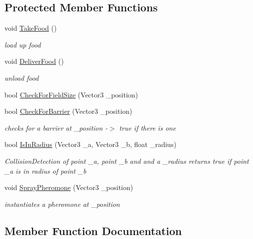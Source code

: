 \subsection*{Protected Member Functions}
\begin{DoxyCompactItemize}
\item 
void \mbox{\hyperlink{class_ant_a038dcc19d796bb4203b1d606d133f906}{Take\+Food}} ()
\begin{DoxyCompactList}\small\item\em load up food \end{DoxyCompactList}\item 
void \mbox{\hyperlink{class_ant_a4c67d1cee8cafa2f97495eda2a27a420}{Deliver\+Food}} ()
\begin{DoxyCompactList}\small\item\em unload food \end{DoxyCompactList}\item 
bool \mbox{\hyperlink{class_ant_a9c342e2d6f14a75860f518ee1086a255}{Check\+For\+Field\+Size}} (Vector3 \+\_\+position)
\item 
bool \mbox{\hyperlink{class_ant_a569320904895aca38fcbc515f3a0c611}{Check\+For\+Barrier}} (Vector3 \+\_\+position)
\begin{DoxyCompactList}\small\item\em checks for a barrier at \+\_\+position -\/$>$ true if there is one \end{DoxyCompactList}\item 
bool \mbox{\hyperlink{class_ant_a3b628e3a1ec52edeaf8b1bcd768b5a22}{Is\+In\+Radius}} (Vector3 \+\_\+a, Vector3 \+\_\+b, float \+\_\+radius)
\begin{DoxyCompactList}\small\item\em Collision\+Detection of point \+\_\+a, point \+\_\+b and and a \+\_\+radius returns true if point \+\_\+a is in radius of point \+\_\+b \end{DoxyCompactList}\item 
void \mbox{\hyperlink{class_ant_a54ff2d8ba8f1f940b3c0357a5ae101fb}{Spray\+Pheromone}} (Vector3 \+\_\+position)
\begin{DoxyCompactList}\small\item\em instantiates a pheromone at \+\_\+position \end{DoxyCompactList}\end{DoxyCompactItemize}


\subsection{Member Function Documentation}
\mbox{\label{class_ant_a569320904895aca38fcbc515f3a0c611}} 
